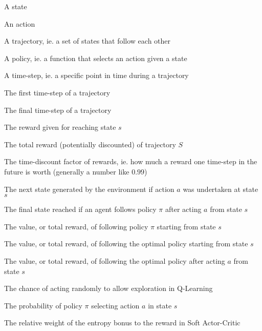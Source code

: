 \begin{description}[style=sameline,leftmargin=3cm,font=\normalfont]
  \item[$s$] A state\\
  \item[$a$] An action\\
  \item[$S$] A trajectory, ie. a set of states that follow each other\\
  \item[$\pi$] A policy, ie. a function that selects an action given a state\\
  \item[$t$] A time-step, ie. a specific point in time during a trajectory\\
  \item[$t_0$] The first time-step of a trajectory\\
  \item[$t_{end}$] The final time-step of a trajectory\\
  \item[$r(s)$] The reward given for reaching state $s$\\
  \item[$R(S)$] The total reward (potentially discounted) of trajectory $S$\\
  \item[$\gamma$] The time-discount factor of rewards, ie. how much a reward one time-step in the future is worth (generally a number like $0.99$)\\
  \item[$Env(s, a)$] The next state generated by the environment if action $a$ was undertaken at state $s$\\
  \item[$Term_{\pi}(s, a)$] The final state reached if an agent follows policy $\pi$ after acting $a$ from state $s$\\
  \item[$V_{\pi}(s)$] The value, or total reward, of following policy $\pi$ starting from state $s$\\
  \item[$V^*(s)$] The value, or total reward, of following the optimal policy starting from state $s$\\
  \item[$Q^*(s, a)$] The value, or total reward, of following the optimal policy after acting $a$ from state $s$\\
  \item[$\epsilon$] The chance of acting randomly to allow exploration in Q-Learning\\
  \item[$P_{\pi, s}(a)$] The probability of policy $\pi$ selecting action $a$ in state $s$\\
  \item[$\alpha$] The relative weight of the entropy bonus to the reward in Soft Actor-Critic\\
\end{description}